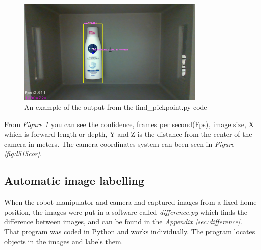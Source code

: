 \begin{figure}[h]
    \centering
    \includegraphics[width=0.8\textwidth]{graphics/findpickpoint.png}
    \caption{An example of the output from the find\_pickpoint.py code}
    \label{fig:findpickpoint}
\end{figure}

From \textit{Figure \ref{fig:findpickpoint}} you can see the confidence, frames per second(Fps), image size, X which is forward length or depth, Y and Z is the distance from the center of the camera in meters. 
The camera coordinates system can been seen in \textit{Figure \ref{fig:l515cor}}.


\subsection{Automatic image labelling}\label{labelimg}
When the robot manipulator and camera had captured images from a fixed home position, the images were put in a software called \textit{difference.py} which finds the difference between images, and can be found in the \textit{Appendix \ref{sec:difference}}. That program was coded in Python and works individually. The program locates objects in the images and labels them. 
